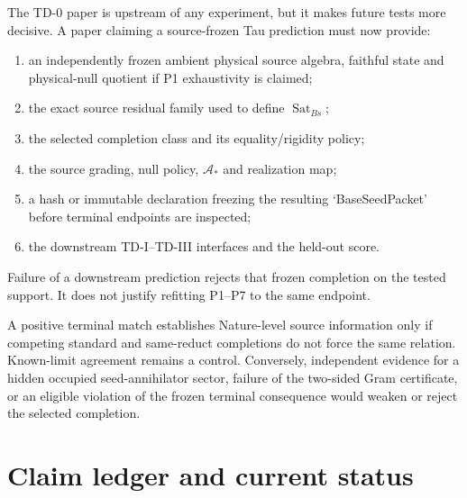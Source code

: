 \documentclass[11pt,a4paper]{article}
\theoremstyle{remark}
\newcommand{\Sat}{\operatorname{Sat}_{Bs}}
\begin{document}
The TD-0 paper is upstream of any experiment, but it makes future tests more
decisive.  A paper claiming a source-frozen Tau prediction must now provide:
\begin{enumerate}
 \item an independently frozen ambient physical source algebra, faithful
 state and physical-null quotient if P1 exhaustivity is claimed;
 \item the exact source residual family used to define $\Sat$;
 \item the selected completion class and its equality/rigidity policy;
 \item the source grading, null policy, $\mathcal A_*$ and realization map;
 \item a hash or immutable declaration freezing the resulting
 `BaseSeedPacket' before terminal endpoints are inspected;
 \item the downstream TD-I--TD-III interfaces and the held-out score.
\end{enumerate}
Failure of a downstream prediction rejects that frozen completion on the
tested support.  It does not justify refitting P1--P7 to the same endpoint.

A positive terminal match establishes Nature-level source information only if
competing standard and same-reduct completions do not force the same relation.
Known-limit agreement remains a control.  Conversely, independent evidence
for a hidden occupied seed-annihilator sector, failure of the two-sided Gram
certificate, or an eligible violation of the frozen terminal consequence
would weaken or reject the selected completion.

\section{Claim ledger and current status}
\end{document}
